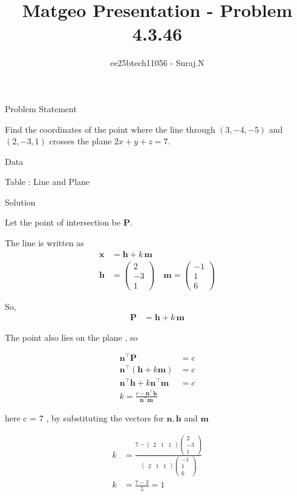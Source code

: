 \documentclass{beamer}
\title{Matgeo Presentation - Problem 4.3.46}
\author{ee25btech11056 - Suraj.N}
\numberwithin{equation}{section}
\theoremstyle{remark}
\newcommand{\myvec}[1]{\ensuremath{\begin{pmatrix}#1\end{pmatrix}}}
\let\vec\mathbf
\begin{document}
\begin{frame}
  \titlepage
\end{frame}

\begin{frame}{Problem Statement}

Find the coordinates of the point where the line through $(3,-4,-5)$ and $(2,-3,1)$ crosses the plane $2x+y+z=7$.

\end{frame}

\begin{frame}{Data}

\begin{table}[h!]
  \centering
  
  \caption*{Table : Line and Plane}
  \label{4.3.46}
\end{table}

\end{frame}

\begin{frame}{Solution}

Let the point of intersection be $\vec{P}$.  

The line is written as
\begin{align}
\vec{x} &= \vec{h} + k\,\vec{m} \\
\vec{h} &= \myvec{2\\-3\\1} \quad
\vec{m} = \myvec{-1\\1\\6}
\end{align}

So,
\begin{align}
\vec{P} &= \vec{h} + k\,\vec{m}
\end{align}

\end{frame}

\begin{frame}

The point also lies on the plane , so

\begin{align}
  \vec{n}^\top\vec{P} &= c\\
  \vec{n}^\top(\vec{h} + k\vec{m}) &= c\\
  \vec{n}^\top\vec{h} + k\vec{n}^\top\vec{m} &= c\\
  k = \frac{c -\vec{n}^\top\vec{h}}{\vec{n}^\top\vec{m}}
\end{align}

here c = 7 , by substituting the vectors for $\vec{n},\vec{h}$ and $\vec{m}$

\begin{align}
k &= \frac{7 - \myvec{2 & 1 & 1}\myvec{2\\-3\\1}}{\myvec{2 & 1 &1}\myvec{-1\\1\\6}}\\
k &= \frac{7 - 2}{5} = 1 
\end{align}

\end{frame}
\end{document}
